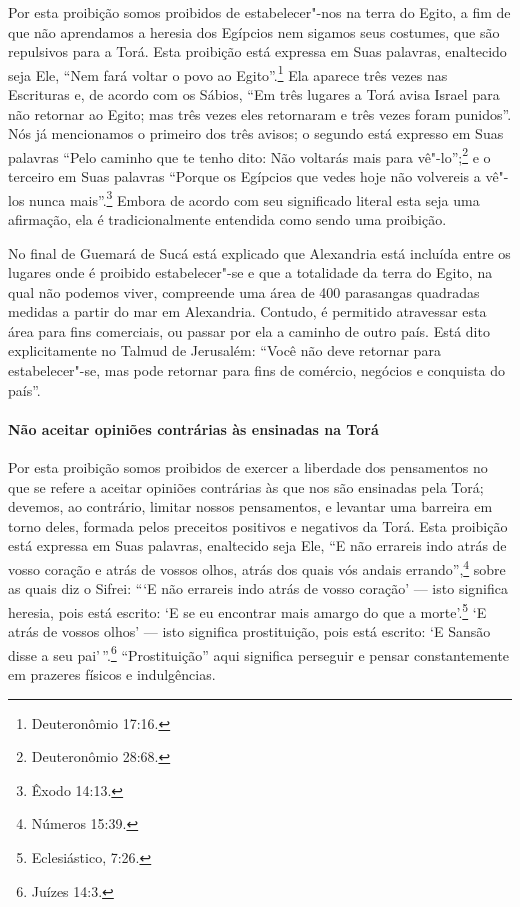 \begin{multicols}{2}
Por esta proibição somos proibidos de estabelecer"-nos na terra do Egito,
a fim de que não aprendamos a heresia dos Egípcios nem sigamos seus
costumes, que são repulsivos para a Torá\starr. Esta proibição está expressa
em Suas palavras, enaltecido seja Ele, ``Nem fará voltar o povo ao
Egito''.\footnote{Deuteronômio 17:16.} Ela aparece três vezes nas Escrituras e, de acordo com os
Sábios, ``Em três lugares a Torá\starr{} avisa Israel para não retornar ao
Egito; mas três vezes eles retornaram e três vezes foram punidos''. Nós
já mencionamos o primeiro dos três avisos; o segundo está expresso em
Suas palavras ``Pelo caminho que te tenho dito: Não voltarás mais para
vê"-lo'';\footnote{Deuteronômio 28:68.} e o terceiro em Suas palavras ``Porque os
Egípcios que vedes hoje não volvereis a vê"-los nunca mais''.\footnote{Êxodo
14:13.} Embora de acordo com seu significado literal esta seja uma
afirmação, ela é tradicionalmente entendida como sendo uma proibição.

No final de Guemará\starr{} de Sucá\starr{} está explicado que Alexandria está incluída
entre os lugares onde é proibido estabelecer"-se e que a totalidade da
terra do Egito, na qual não podemos viver, compreende uma área de 400
parasangas\starr{} quadradas medidas a partir do mar em Alexandria. Contudo, é
permitido atravessar esta área para fins comerciais, ou passar por ela a
caminho de outro país. Está dito explicitamente no Talmud\starr{} de Jerusalém:
``Você não deve retornar para estabelecer"-se, mas pode retornar para
fins de comércio, negócios e conquista do país''.

\paragraph{Não aceitar opiniões contrárias às ensinadas na Torá\starr{}}

Por esta proibição somos proibidos de exercer a liberdade dos
pensamentos no que se refere a aceitar opiniões contrárias às que nos
são ensinadas pela Torá\starr; devemos, ao contrário, limitar nossos
pensamentos, e levantar uma barreira em torno deles, formada pelos
preceitos positivos e negativos da Torá\starr. Esta proibição está expressa
em Suas palavras, enaltecido seja Ele, ``E não errareis indo atrás de
vosso coração e atrás de vossos olhos, atrás dos quais vós andais
errando'',\footnote{Números 15:39.} sobre as quais diz o Sifrei\starr: ```E não
errareis indo atrás de vosso coração' --- isto significa heresia, pois
está escrito: `E se eu encontrar mais amargo do que a
morte'.\footnote{Eclesiástico, 7:26.} `E atrás de vossos olhos' --- isto
significa prostituição, pois está escrito: `E Sansão disse a seu
pai'\,''.\footnote{Juízes 14:3.} ``Prostituição'' aqui significa perseguir
e pensar constantemente em prazeres físicos e indulgências.


\end{multicols}
